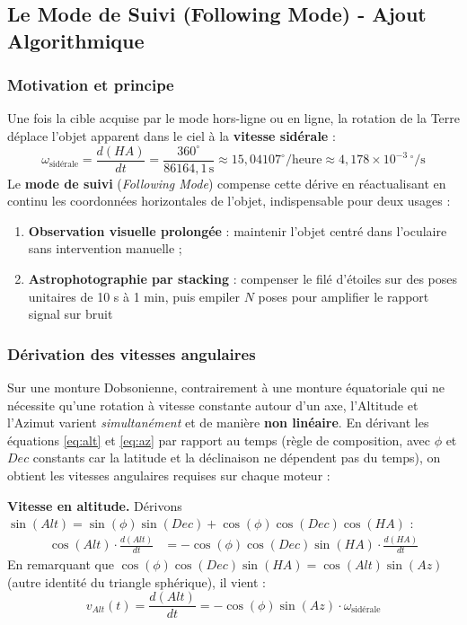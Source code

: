 \documentclass[12pt,a4paper]{report}
\begin{document}
\begin{enumerate}
\subsection{Le Mode de Suivi (Following Mode) - Ajout Algorithmique}
\subsubsection{Motivation et principe}
Une fois la cible acquise par le mode hors-ligne ou en ligne, la rotation de la Terre déplace l'objet apparent dans le ciel à la \textbf{vitesse sidérale} :
\begin{equation}
    \omega_{\text{sidérale}} = \frac{d(HA)}{dt} = \frac{360^\circ}{86164{,}1\,\text{s}} \approx 15{,}04107^\circ/\text{heure} \approx 4{,}178 \times 10^{-3}\,{}^\circ/\text{s}
\end{equation}
Le \textbf{mode de suivi} (\textit{Following Mode}) compense cette dérive en réactualisant en continu les coordonnées horizontales de l'objet, indispensable pour deux usages :
\begin{enumerate}
    \item \textbf{Observation visuelle prolongée} : maintenir l'objet centré dans l'oculaire sans intervention manuelle ;
    \item \textbf{Astrophotographie par stacking} : compenser le filé d'étoiles sur des poses unitaires de 10 s à 1 min, puis empiler $N$ poses pour amplifier le rapport signal sur bruit
\end{enumerate}

\subsubsection{Dérivation des vitesses angulaires}
Sur une monture Dobsonienne, contrairement à une monture équatoriale qui ne nécessite qu'une rotation à vitesse constante autour d'un axe, l'Altitude et l'Azimut varient \textit{simultanément} et de manière \textbf{non linéaire}. En dérivant les équations \eqref{eq:alt} et \eqref{eq:az} par rapport au temps (règle de composition, avec $\phi$ et $Dec$ constants car la latitude et la déclinaison ne dépendent pas du temps), on obtient les vitesses angulaires requises sur chaque moteur :

\textbf{Vitesse en altitude.} Dérivons $\sin(Alt) = \sin(\phi)\sin(Dec) + \cos(\phi)\cos(Dec)\cos(HA)$ :
\begin{align}
    \cos(Alt) \cdot \frac{d(Alt)}{dt} &= -\cos(\phi)\cos(Dec)\sin(HA) \cdot \frac{d(HA)}{dt}
\end{align}
En remarquant que $\cos(\phi)\cos(Dec)\sin(HA) = \cos(Alt)\sin(Az)$ (autre identité du triangle sphérique), il vient :
\begin{equation}
    \boxed{\;v_{Alt}(t) = \frac{d(Alt)}{dt} = -\cos(\phi)\sin(Az) \cdot \omega_{\text{sidérale}}\;}
    \label{eq:vAlt}
\end{equation}


\end{enumerate}
\end{document}
